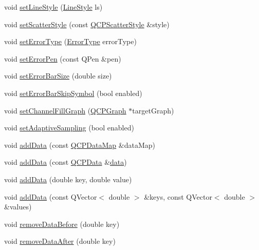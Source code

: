 \begin{DoxyCompactItemize}
\item 
void \hyperlink{classQCPGraph_a513fecccff5b2a50ce53f665338c60ff}{set\-Line\-Style} (\hyperlink{classQCPGraph_ad60175cd9b5cac937c5ee685c32c0859}{\-Line\-Style} ls)
\item 
void \hyperlink{classQCPGraph_a12bd17a8ba21983163ec5d8f42a9fea5}{set\-Scatter\-Style} (const \hyperlink{classQCPScatterStyle}{\-Q\-C\-P\-Scatter\-Style} \&style)
\item 
void \hyperlink{classQCPGraph_ac3614d799c3894f2bc646e99c7f73d38}{set\-Error\-Type} (\hyperlink{classQCPGraph_ad23b514404bd2cb3216f57c90904d6af}{\-Error\-Type} error\-Type)
\item 
void \hyperlink{classQCPGraph_abd4c7f81939e10776ea64603a704f22a}{set\-Error\-Pen} (const \-Q\-Pen \&pen)
\item 
void \hyperlink{classQCPGraph_a10f50c5495ce45ef559ec2066194a335}{set\-Error\-Bar\-Size} (double size)
\item 
void \hyperlink{classQCPGraph_ab1c1ee03d8dd94676a564e5e5f11aac2}{set\-Error\-Bar\-Skip\-Symbol} (bool enabled)
\item 
void \hyperlink{classQCPGraph_a2d03156df1b64037a2e36cfa50351ca3}{set\-Channel\-Fill\-Graph} (\hyperlink{classQCPGraph}{\-Q\-C\-P\-Graph} $\ast$target\-Graph)
\item 
void \hyperlink{classQCPGraph_ab468cd600160f327836aa0644291e64c}{set\-Adaptive\-Sampling} (bool enabled)
\item 
void \hyperlink{classQCPGraph_aa5c6181d84db72ce4dbe9dc15a34ef4f}{add\-Data} (const \hyperlink{qcustomplot_8h_a84a9c4a4c2216ccfdcb5f3067cda76e3}{\-Q\-C\-P\-Data\-Map} \&data\-Map)
\item 
void \hyperlink{classQCPGraph_a80cc91e1e0ef77eb50afc5b366d0efd9}{add\-Data} (const \hyperlink{classQCPData}{\-Q\-C\-P\-Data} \&\hyperlink{classQCPGraph_a2f58436df4f86a2792b776a21642b3d9}{data})
\item 
void \hyperlink{classQCPGraph_a0bf98b1972286cfb7b1c4b7dd6ae2012}{add\-Data} (double key, double value)
\item 
void \hyperlink{classQCPGraph_ab6da6377541fe80d892a9893a92db9c6}{add\-Data} (const \-Q\-Vector$<$ double $>$ \&keys, const \-Q\-Vector$<$ double $>$ \&values)
\item 
void \hyperlink{classQCPGraph_a9fe0b3e54e8c7b61319bd03337e21e99}{remove\-Data\-Before} (double key)
\item 
void \hyperlink{classQCPGraph_ae42d645ef617cfc75fc0df58e62c522a}{remove\-Data\-After} (double key)
\item 

\end{DoxyCompactItemize}
